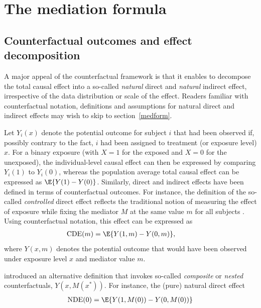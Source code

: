 \documentclass[nojss]{jss}
\begin{document}
\section{The mediation formula}
\subsection{Counterfactual outcomes and effect decomposition}
A major appeal of the counterfactual framework is that it enables to decompose the total causal effect into a so-called \textit{natural} direct and \textit{natural} indirect effect, irrespective of the data distribution or scale of the effect. Readers familiar with counterfactual notation, definitions and assumptions for natural direct and indirect effects may wish to skip to section~\ref{medform}. 
\par Let $Y_i(x)$ denote the potential outcome for subject $i$ that had been observed if, possibly contrary to the fact, $i$ had been assigned to treatment (or exposure level) $x$. For a binary exposure (with $X = 1$ for the exposed and $X = 0$ for the unexposed), the individual-level causal effect can then be expressed by comparing $Y_i(1)$ to $Y_i(0)$, whereas the population average total causal effect can be expressed as $\E\{Y(1) - Y(0)\}$. Similarly, direct and indirect effects have been defined in terms of counterfactual outcomes. For instance, the definition of the so-called \textit{controlled} direct effect reflects the traditional notion of measuring the effect of exposure while fixing the mediator $M$ at the same value $m$ for all subjects \citep{Greenland1992}. Using counterfactual notation, this effect can be expressed as
\begin{align*}
\mbox{CDE}(m) &= \E\{Y(1,m) - Y(0,m)\},\\[-\baselineskip]
\hphantom{\mbox{NIE}(1)} &\hphantom{= \E\{Y(1,M(1)) - Y(1,M(0))\},}
\end{align*}
where $Y(x,m)$ denotes the potential outcome that would have been observed under exposure level $x$ and mediator value $m$.
\par \cite{Greenland1992} introduced an alternative definition that invokes so-called \textit{composite} or \textit{nested} counterfactuals, $Y(x,M(x^*))$. For instance, the (pure) natural direct effect 
\begin{align*}
\mbox{NDE}(0) &= \E\{Y(1,M(0)) - Y(0,M(0))\}\\[-\baselineskip]
\hphantom{\mbox{NIE}(1)} &\hphantom{= \E\{Y(1,M(1)) - Y(1,M(0))\},}
\end{align*}
\end{document}

